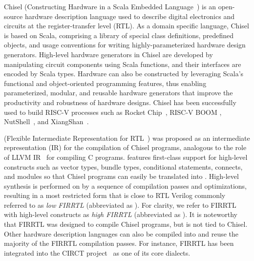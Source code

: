 
Chisel (Constructing Hardware in a Scala Embedded Language~\cite{BachrachVRLWAWA12}) is an open-source hardware description language
used to describe digital electronics and circuits at the register-transfer level (RTL).
%
As a domain specific language, Chisel is %
based on Scala, comprising a library of special class definitions, predefined objects, and usage conventions for writing highly-parameterized hardware design generators.
High-level hardware generators in Chisel are developed by manipulating circuit components using Scala functions, and their interfaces are encoded by Scala types.
Hardware can also be constructed by leveraging Scala's functional and object-oriented programming features, thus enabling parameterized, modular, and reusable hardware generators that improve the productivity and robustness of  hardware designs.
Chisel has been successfully used to build RISC-V processes such as Rocket Chip~\cite{RocketChip}, RISC-V BOOM \cite{Boom}, NutShell~\cite{NutShell},
and XiangShan~\cite{xiangshan,Xiangshan-github}.

{\firrtl} (Flexible Intermediate Representation for RTL~\cite{IzraelevitzKLLW17,firrtl-spec}) was proposed  as an intermediate representation (IR) for the compilation of Chisel programs, analogous to the role of LLVM IR~\cite{LLVM} for compiling C programs.
{\firrtl} features first-class support for high-level constructs such as vector types, bundle types, conditional statements, connects,
and modules so that Chisel programs can easily be translated into {\firrtl}.
%
High-level synthesis is performed on {\firrtl} by a sequence of compilation passes and optimizations,
resulting in a most restricted form that is close to RTL Verilog commonly referred to as \emph{low FIRRTL} (abbreviated as {\lofirrtl}).
For clarity, we refer to FIRRTL with high-level constructs as \emph{high FIRRTL} (abbreviated as {\hifirrtl}).
It is noteworthy that FIRRTL was designed to compile Chisel programs, but is not tied to Chisel. Other hardware description languages can also be compiled into {\firrtl} and reuse the majority of the FIRRTL compilation passes. For instance, FIRRTL has been integrated into the CIRCT project~\cite{CIRCT} as one of its core dialects.


